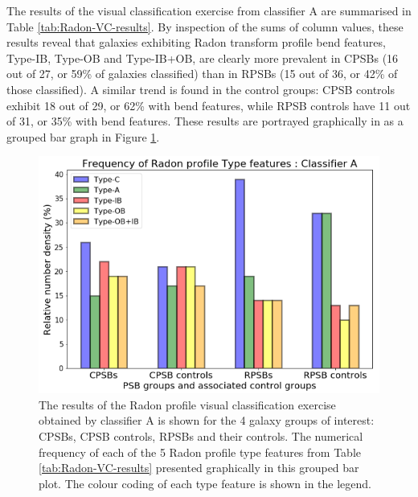 The results of the visual classification exercise from classifier A are summarised in Table \ref{tab:Radon-VC-results}. By inspection of the sums of column values, these results reveal that galaxies exhibiting Radon transform profile bend features, Type-IB, Type-OB and Type-IB+OB, are clearly more prevalent in CPSBs (16 out of 27, or 59\% of galaxies classified) than in RPSBs (15 out of 36, or 42\% of those classified). A similar trend is found in the control groups: CPSB controls exhibit 18 out of 29, or 62\% with bend features, while RPSB controls have 11 out of 31, or 35\% with bend features. These results are portrayed graphically in as a grouped bar graph in Figure \ref{fig:Radon-grouped-barchart}.

\begin{figure}
    \centering
    \includegraphics[width=\columnwidth]{images/JupyterPlots/PROFILE-GROUPS-CLASSIFIER-A.png}
    \caption[Radon profile Type classifications determined by classifier A]{The results of the Radon profile visual classification exercise obtained by classifier A is shown for the 4 galaxy groups of interest: CPSBs, CPSB controls, RPSBs and their controls. The numerical frequency of each of the 5 Radon profile type features from Table \ref{tab:Radon-VC-results} presented graphically in this grouped bar plot. The colour coding of each type feature is shown in the legend.}
    \label{fig:Radon-grouped-barchart}
\end{figure}

